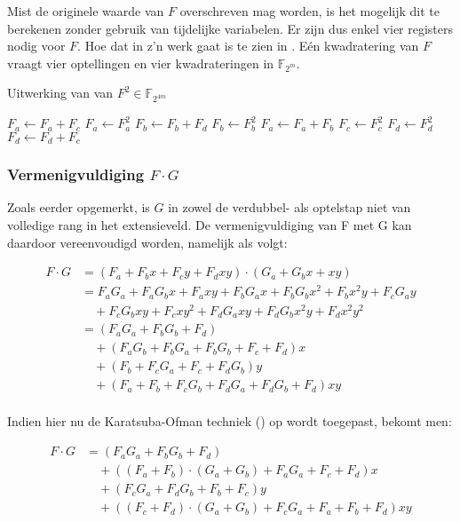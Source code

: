 Mist de originele waarde van $F$ overschreven mag worden, is het mogelijk dit te berekenen zonder gebruik van tijdelijke variabelen. Er zijn dus enkel vier registers nodig voor $F$. Hoe dat in z'n werk gaat is te zien in . E\'en kwadratering van $F$ vraagt vier optellingen en vier kwadrateringen in $\mathbb{F}_{2^m}$.

\begin{algorithm}[h]
	\caption{Uitwerking van van $F^2 \in \mathbb{F}_{2^{4m}}$}
	\label{algoritme-implementatie-miller-f-square}
	$F_a \leftarrow F_a + F_c$\;
	$F_a \leftarrow F_a^2$\;
	$F_b \leftarrow F_b + F_d$\;
	$F_b \leftarrow F_b^2$\;
	$F_a \leftarrow F_a + F_b$\;
	$F_c \leftarrow F_c^2$\;
	$F_d \leftarrow F_d^2$\;
	$F_d \leftarrow F_d + F_c$\;
\end{algorithm}

\subsubsection{Vermenigvuldiging $F \cdot G$}

Zoals eerder opgemerkt, is $G$ in zowel de verdubbel- als optelstap niet van volledige rang in het extensieveld. De vermenigvuldiging van F met G kan daardoor vereenvoudigd worden, namelijk als volgt:

\[\begin{aligned}
F \cdot G	&= (F_a + F_b x + F_c y + F_d xy) \cdot (G_a + G_b x + xy)\\
	&= F_a G_a + F_a G_b x + F_a xy + F_b G_a x + F_b G_b x^2 + F_b x^2y + F_c G_a y\\
		&\quad + F_c G_b xy + F_c xy^2 + F_d G_a xy + F_d G_b x^2y + F_d x^2 y^2\\
	&= (F_a G_a + F_b G_b + F_d)\\
		&\quad + (F_a G_b + F_b G_a + F_b G_b + F_c + F_d)x\\
		&\quad + (F_b + F_c G_a + F_c + F_d G_b)y\\
		&\quad + (F_a + F_b + F_c G_b + F_d G_a + F_d G_b + F_d)xy\\
\end{aligned}\]

Indien hier nu de Karatsuba-Ofman techniek (\cite{karatsuba-oldest, zuras}) op wordt toegepast, bekomt men:

\[\begin{aligned}
F \cdot G &= (F_a G_a + F_b G_b + F_d)\\
				&\quad + ((F_a + F_b) \cdot (G_a + G_b) + F_a G_a + F_c + F_d)x\\
				&\quad + (F_c G_a + F_d G_b + F_b + F_c)y\\
				&\quad + ((F_c + F_d) \cdot (G_a + G_b) + F_c G_a + F_a + F_b + F_d)xy\\
\end{aligned}\]

